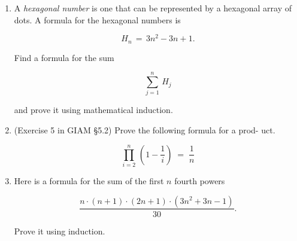 \documentclass{amsart}
\begin{document}
\begin{enumerate}
\vfill

\newpage

\item A {\em hexagonal number} is one that can be represented by a hexagonal
array of dots.  A formula for the hexagonal numbers is

\[ H_n \, = \, 3n^2 - 3n + 1. \]

Find a formula for the sum

\[
\sum_{j=1}^n \, H_j 
\] 

\noindent and prove it using mathematical induction.

\vfill

\newpage

\item (Exercise 5 in GIAM \S 5.2) Prove the following formula for a prod-
uct.

\[ \prod_{i=2}^n \, \left( 1 - \frac{1}{i} \right) \; = \; \frac{1}{n}  \]

\vfill

\newpage

\item Here is a formula for the sum of the first $n$ fourth powers

\[ \frac{n \cdot (n + 1) \cdot (2n + 1) \cdot (3n^2 + 3n - 1)}{30}. \]

Prove it using induction.

\vfill


\end{enumerate}
\end{document}
